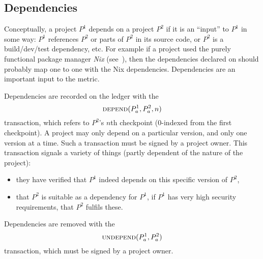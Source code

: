 \subsection{Dependencies}\label{s:dependencies}
Conceptually, a project $P^1$ depends on a project $P^2$ if it is an
``input'' to $P^1$ in some way: $P^1$ references $P^2$ or parts of
$P^2$ in its source code, or $P^2$ is a build/dev/test dependency,
etc. For example if a project used the purely functional package
manager \emph{Nix} (see~\cite{nix}), then the dependencies declared on
\oscoin{} should probably map one to one with the Nix
dependencies. Dependencies are an important input to the \osrank{}
metric.

Dependencies are recorded on the ledger with the
\[
    \text{\normalfont\scshape depend}\small{\lparen P^1_a, P^2_a, n\rparen}
\]
transaction, which refers to $P^2$'s $n$th checkpoint ($0$-indexed
from the first checkpoint). A project may only depend on a particular
version, and only one version at a
time. %
Such a transaction must be signed by a project owner. This transaction
signals a variety of things (partly dependent of the nature of the
project):
\begin{itemize}
\item they have verified that $P^1$ indeed depends on this specific
  version of $P^2$,
\item that $P^2$ is suitable as a dependency for $P^1$, \eg{} if $P^1$
  has very high security requirements, that $P^2$ fulfils these.
\end{itemize}

Dependencies are removed with the
\[
    \text{\normalfont\scshape undepend}\small{\lparen P^1_a, P^2_a\rparen}
\]
transaction, which must be signed by a project owner.

